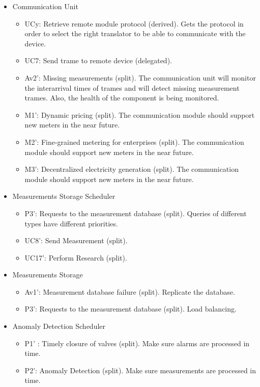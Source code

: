\begin{itemize}
	\item Communication Unit
	\begin{itemize}
	  	\item UCy: Retrieve remote module protocol (derived). Gets the protocol in
	  	order to select the right translator to be able to communicate with the device. 
		\item UC7: Send trame to remote device (delegated). 
		\item Av2': Missing measurements (split). The communication unit will monitor
		the interarrival times of trames and will detect missing measurement trames.
		Also, the health of the component is being monitored.
		\item M1': Dynamic pricing (split). The communication module should support
		new meters in the near future. 
		\item M2': Fine-grained metering for enterprises (split). The communication
		module should support new meters in the near future. 
		\item M3': Decentralized electricity generation (split). The communication
		module should support new meters in the near future.
	\end{itemize}
	\item Measurements Storage Scheduler
	\begin{itemize}
		\item P3': Requests to the measurement database (split). Queries of different
		types have different priorities.
		\item UC8': Send Measurement (split). 
		\item UC17': Perform Research (split). 
	\end{itemize}
	\item Measurements Storage
	\begin{itemize}
		\item Av1': Measurement database failure (split). Replicate the database.
	  	\item P3': Requests to the measurement database (split). Load balancing.
	\end{itemize}
	\item Anomaly Detection Scheduler
	\begin{itemize}
		\item P1' : Timely closure of valves (split). Make sure alarms are processed
		in time. 
	  	\item P2': Anomaly Detection (split). Make sure measurements are processed
	  	in time. 

\end{itemize}
\end{itemize}
